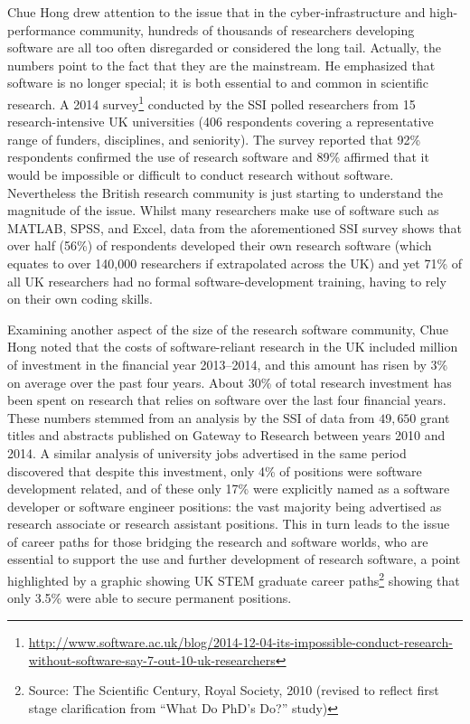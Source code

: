 \documentclass[11pt, oneside]{amsart}
\begin{document}
Chue Hong drew attention to the issue that in the cyber-infrastructure and
high-performance community, hundreds of thousands
of researchers developing software are all too often disregarded or considered the long tail.
Actually, the numbers point to the fact that they are the mainstream. %
He emphasized that software is no longer special; it is both essential to and
common in scientific research. A 2014
survey\footnote{\url{http://www.software.ac.uk/blog/2014-12-04-its-impossible-conduct-research-without-software-say-7-out-10-uk-researchers}}
conducted by the SSI polled researchers from 15 research-intensive UK
universities (406 respondents covering a representative range of funders,
disciplines, and seniority). The survey reported that 92\% respondents confirmed the use of research
software and 89\% affirmed that it would be impossible or difficult to conduct
research without software. Nevertheless the British research community is just
starting to understand the magnitude of the issue. Whilst many researchers make
use of software such as MATLAB, SPSS, and Excel, data from the aforementioned
SSI survey shows that over half (56\%) of respondents developed their own
research software (which equates to over 140,000 researchers if extrapolated
across the UK) and yet 71\% of all UK researchers had no formal software-development training, having
to rely on their own coding skills.

Examining another aspect of the size of the research software community,
Chue Hong noted that the costs of software-reliant research in the UK
included  million of investment in the financial year
2013--2014, and this amount has risen by 3\% on average over the past four
years. About 30\% of total research investment has been spent on research that
relies on software over the last four financial years. These numbers stemmed
from an analysis by the SSI of data from $49,650$ grant titles and abstracts published on
Gateway to Research between years 2010 and 2014. A similar analysis of university
jobs advertised in the same period discovered that despite this investment, only
4\% of positions were software development related, and of these only 17\% were
explicitly named as a software developer or software engineer positions: the vast
majority being advertised as research associate or research assistant positions.
This in turn leads to the issue of career paths for those bridging the research
and software worlds, who are essential to support the use and further
development of research software, a point highlighted by a graphic showing UK
STEM graduate career paths\footnote{Source: The Scientific Century, Royal
Society, 2010 (revised to reflect first stage clarification from ``What Do PhD's
Do?'' study)} showing that only 3.5\% were able to secure permanent positions.
\end{document}
